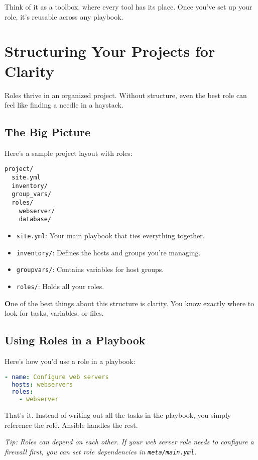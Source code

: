 Think of it as a toolbox, where every tool has its place. Once you've set up your role, it's reusable across any playbook.

\section{Structuring Your Projects for Clarity}

Roles thrive in an organized project. Without structure, even the best role can feel like finding a needle in a haystack.

\subsection{The Big Picture}

Here's a sample project layout with roles:
\begin{verbatim}
project/
  site.yml
  inventory/
  group_vars/
  roles/
    webserver/
    database/
\end{verbatim}

\begin{itemize}
    \item \texttt{site.yml}: Your main playbook that ties everything together.
    \item \texttt{inventory/}: Defines the hosts and groups you're managing.
    \item \texttt{group\textunderscore vars/}: Contains variables for host groups.
    \item \texttt{roles/}: Holds all your roles.
\end{itemize}

\textbf{O}ne of the best things about this structure is clarity. You know exactly where to look for tasks, variables, or files.

\subsection{Using Roles in a Playbook}

Here's how you'd use a role in a playbook:
\begin{lstlisting}[language=yaml, caption=Using a Role in a Playbook]
- name: Configure web servers
  hosts: webservers
  roles:
    - webserver
\end{lstlisting}

That's it. Instead of writing out all the tasks in the playbook, you simply reference the role. Ansible handles the rest.

\textit{Tip: Roles can depend on each other. If your web server role needs to configure a firewall first, you can set role dependencies in \texttt{meta/main.yml}.}

